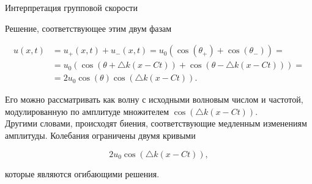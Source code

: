 \documentclass[10pt,xcolor=pst,aspectratio=169]{beamer}
\begin{document}
\begin{frame}{Интерпретация групповой скорости}

    \transdissolve[duration=0.1]
    \justifying
    \large

    Решение, соответствующее этим двум фазам

    \[
        \begin{split}
            u \left( x, t \right) & = u_{+} \left( x, t \right) + u_{-} \left( x, t \right) = u_{0} \left( \cos \left( \theta_{+} \right) + \cos \left( \theta_{-} \right) \right) = \\
            & = u_{0} \left( \cos \left( \theta + \triangle k \left( x - C t \right) \right) + \cos \left( \theta - \triangle k \left( x - C t \right) \right) \right) = \\
            & = 2 u_{0} \cos \left( \theta \right) \cos \left( \triangle k \left( x - C t \right) \right).
        \end{split}
    \]

    Его можно рассматривать как волну с исходными волновым числом и частотой, модулированную по амплитуде множителем $\cos \left( \triangle k \left( x - C t \right) \right)$. \\

    Другими словами, происходят биения, соответствующие медленным изменениям амплитуды. Колебания ограничены двумя кривыми

    \[
        2 u_{0} \cos \left( \triangle k \left( x - C t \right) \right),
    \]

    которые являются огибающими решения.


\end{frame}
\end{document}

